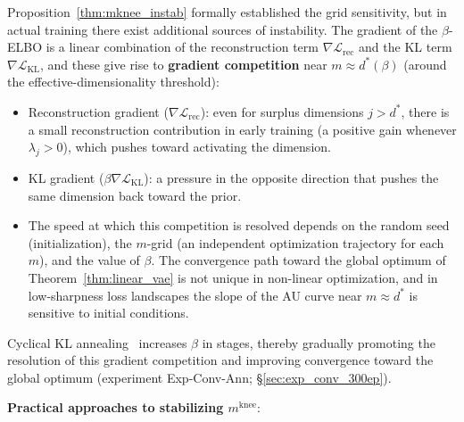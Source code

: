 \documentclass[make,article,submit,pdftex,moreauthors]{Definitions/mdpi}
\newcommand{\mknee}{m^{\mathrm{knee}}}
\begin{document}
Proposition~\ref{thm:mknee_instab} formally established the grid sensitivity, but in
actual training there exist additional sources of instability.
The gradient of the $\beta$-ELBO is a linear combination of the reconstruction term
$\nabla\mathcal{L}_\mathrm{rec}$ and the KL term $\nabla\mathcal{L}_\mathrm{KL}$,
and these give rise to \textbf{gradient competition} near $m \approx d^*(\beta)$
(around the effective-dimensionality threshold):

\begin{itemize}
  \item Reconstruction gradient ($\nabla\mathcal{L}_\mathrm{rec}$): even for surplus
        dimensions $j > d^*$, there is a small reconstruction contribution in early
        training (a positive gain whenever $\lambda_j > 0$), which pushes toward
        activating the dimension.
  \item KL gradient ($\beta\nabla\mathcal{L}_\mathrm{KL}$): a pressure in the opposite
        direction that pushes the same dimension back toward the prior.
  \item The speed at which this competition is resolved depends on the random seed
        (initialization), the $m$-grid (an independent optimization trajectory for
        each $m$), and the value of $\beta$. The convergence path toward the global
        optimum of Theorem~\ref{thm:linear_vae} is not unique in non-linear
        optimization, and in low-sharpness loss landscapes the slope of the AU curve
        near $m \approx d^*$ is sensitive to initial conditions.
\end{itemize}

Cyclical KL annealing~\cite{fu2019cyclical} increases $\beta$ in stages, thereby
gradually promoting the resolution of this gradient competition and improving
convergence toward the global optimum
(experiment Exp-Conv-Ann; \S\ref{sec:exp_conv_300ep}).

\textbf{Practical approaches to stabilizing $\mknee$}:
\end{document}
